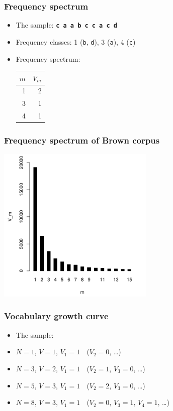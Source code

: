 \documentclass[t]{beamer} %
\begin{document}
\begin{frame}
\frametitle{Frequency spectrum}

  \begin{itemize}
  \item The sample:  \texttt{\textbf{c a a b c c a c d}}
  \item Frequency classes: 1 (\texttt{b}, \texttt{d}), 3 (\texttt{a}), 4 (\texttt{c})
  \item Frequency spectrum:
    \begin{center}
      \begin{tabular}{r|r}
        $m$ & $V_m$\\
        \hline
        1 & 2\\
        3 & 1\\
        4 & 1
      \end{tabular}
    \end{center}
  \end{itemize}
\end{frame}

\begin{frame}
  \frametitle{Frequency spectrum of Brown corpus}
   
  \ungap
  \begin{center}
    \includegraphics[height=7.5cm]{img/brown-spc}
  \end{center}
\end{frame}

\begin{frame}
 \frametitle{Vocabulary growth curve}

  \begin{itemize}
  \item<1-> The sample: \texttt{   }
  \item<2-> $N = 1$, $V = 1$, $V_1 = 1$ $\;$ ($V_2 = 0$, \ldots)
  \item<3-> $N = 3$, $V = 2$, $V_1 = 1$ $\;$ ($V_2 = 1$, $V_3 = 0$, \ldots)
  \item<4-> $N = 5$, $V = 3$, $V_1 = 1$ $\;$ ($V_2 = 2$, $V_3 = 0$, \ldots)
  \item<5-> $N = 8$, $V = 3$, $V_1 = 1$ $\;$ ($V_2 = 0$, $V_3 = 1$, $V_4 = 1$, \ldots)
  \end{itemize}
\end{frame}
\end{document}
